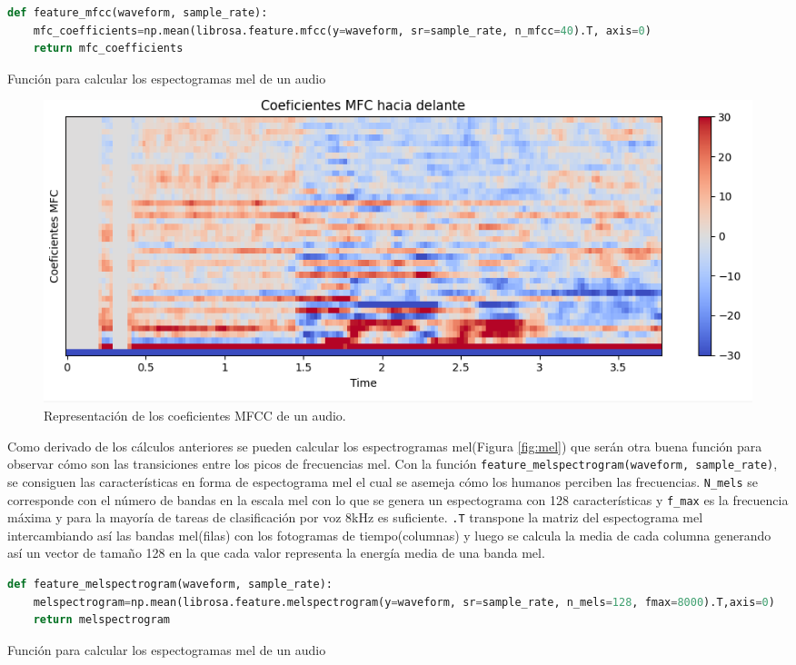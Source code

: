 \begin{code}[H]
\begin{lstlisting}[language=Python]
def feature_mfcc(waveform, sample_rate):
    mfc_coefficients=np.mean(librosa.feature.mfcc(y=waveform, sr=sample_rate, n_mfcc=40).T, axis=0)
    return mfc_coefficients
\end{lstlisting}
\caption[Función para calcular los espectogramas mel de un audio]{Función para calcular los espectogramas mel de un audio}
\label{cod:codejemplo5}
\end{code}

\begin{figure}[H]
  \centering
  \includegraphics[scale=0.4]{figs/coeficientes_mfc} %
  \caption{ Representación de los coeficientes MFCC de un audio.}
  \label{fig:mfcc}
\end{figure}

Como derivado de los cálculos anteriores se pueden calcular los espectrogramas mel(Figura \ref{fig:mel}) que serán otra buena función para observar cómo son las transiciones entre los picos de frecuencias mel. Con la función \verb|feature_melspectrogram(waveform, sample_rate)|, se consiguen las características en forma de espectograma mel el cual se asemeja cómo los humanos perciben las frecuencias. \texttt{N\_mels} se corresponde con el número de bandas en la escala mel con lo que se genera un espectograma con 128 características y \texttt{f\_max} es la frecuencia máxima y para la mayoría de tareas de clasificación por voz 8kHz es suficiente. \texttt{.T} transpone la matriz del espectograma mel intercambiando así las bandas mel(filas) con los fotogramas de tiempo(columnas) y luego se calcula la media de cada columna generando así un vector de tamaño 128 en la que cada valor representa la energía media de una banda mel.



\begin{code}[H]
\begin{lstlisting}[language=Python]
def feature_melspectrogram(waveform, sample_rate):
    melspectrogram=np.mean(librosa.feature.melspectrogram(y=waveform, sr=sample_rate, n_mels=128, fmax=8000).T,axis=0)
    return melspectrogram
\end{lstlisting}
\caption[Función para calcular los espectogramas mel de un audio]{Función para calcular los espectogramas mel de un audio}
\label{cod:codejemplo5}
\end{code}

